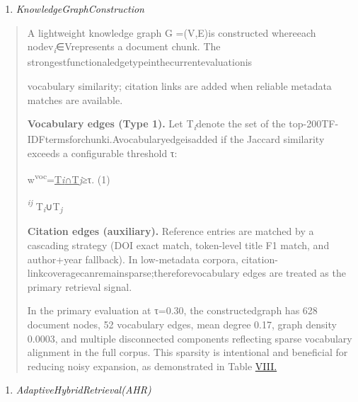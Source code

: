 \documentclass[
]{article}
\begin{document}
\begin{enumerate}
\def\labelenumi{\Alph{enumi}.}
\setcounter{enumi}{2}
\item
  \emph{KnowledgeGraphConstruction}
\end{enumerate}

\begin{quote}
A lightweight knowledge graph G =(V,E)is constructed whereeach nodev\emph{\textsubscript{i}}∈Vrepresents a document chunk. The strongestfunctionaledgetypeinthecurrentevaluationis

vocabulary similarity; citation links are added when reliable metadata matches are available.

\textbf{Vocabulary edges (Type 1).} Let T\emph{\textsubscript{i}}denote the set of the top-200TF-IDFtermsforchunki.Avocabularyedgeisadded if the Jaccard similarity exceeds a configurable threshold τ:

w\textsuperscript{voc}=\ul{\textbar T\emph{i}∩T\emph{j}\textbar{}}≥τ. (1)

\emph{\textsuperscript{ij}} \textbar T\emph{\textsubscript{i}}∪T\emph{\textsubscript{j}}\textbar{}

\textbf{Citation edges (auxiliary).} Reference entries are matched by a cascading strategy (DOI exact match, token-level title F1 match, and author+year fallback). In low-metadata corpora, citation-linkcoveragecanremainsparse;thereforevocabulary edges are treated as the primary retrieval signal.

In the primary evaluation at τ=0.30, the constructedgraph has 628 document nodes, 52 vocabulary edges, mean degree 0.17, graph density 0.0003, and multiple disconnected components reflecting sparse vocabulary alignment in the full corpus. This sparsity is intentional and beneficial for reducing noisy expansion, as demonstrated in Table \hyperref[_bookmark18]{VIII.}
\end{quote}

\begin{enumerate}
\def\labelenumi{\Alph{enumi}.}
\setcounter{enumi}{3}
\item
  \emph{AdaptiveHybridRetrieval(AHR)}
\end{enumerate}
\end{document}
